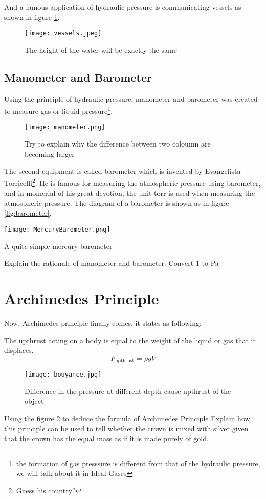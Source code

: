 \documentclass[a4paper]{tufte-handout}
\newenvironment{pagefigure}{%
    \begin{figure}[h]
    \classiccaptionstyle
  }{\end{figure}}
\newenvironment{TaskBox} %
{\begin{tcolorbox}[breakable,colback=b1!30,colframe=b1,title=Task]} {\end{tcolorbox}}
\newenvironment{SummBox}
{\begin{tcolorbox}[breakable,colback=r1!30,colframe=r1,title=Summary]} {\end{tcolorbox}}
\begin{document}
And a famous application of hydraulic pressure is communicating vessels as shown in figure \ref{fig:vessels}.
\begin{pagefigure}
\centering
\texttt{[image: vessels.jpeg]}
\caption{The height of the water will be exactly the same}
\label{fig:vessels}
\end{pagefigure}

\subsection{Manometer and Barometer}
Using the principle of hydraulic pressure, manometer and barometer was created to measure gas or liquid  pressure\footnote{the formation of gas presssure is different from that of the hydraulic pressure, we will talk about it in Ideal Gases}.
\begin{pagefigure}
\centering
\texttt{[image: manometer.png]}
\caption{Try to explain why the difference between two coloumn are becoming larger}
\end{pagefigure}

The second equipment is called barometer which is invented by Evangelista Torricelli\footnote{Guess his country?}. He is famous for measuring the atmospheric pressure using barometer, and in momerial of his great devotion, the unit torr is used when measuring the atmospheric pressure. The diagram of a barometer is shown as in figure \ref{fig:barometer}.
\begin{marginfigure}
\texttt{[image: MercuryBarometer.png]}
\caption{A quite simple mercury barometer}
\label{fig:barometer}
\end{marginfigure}

\begin{TaskBox}
Explain the rationale of manometer and barometer.
\tcblower
Convert \SI{1}{\torr} to \si{\pascal}
\end{TaskBox}

\section{Archimedes Principle}
Now, Archimedes principle finally comes, it states as following:
\begin{SummBox}
The upthrust acting on a body is equal to the weight of the liquid or gas that it displaces.
\[
  F_{\text{upthrust}} = \rho g V
\]
\end{SummBox}

\begin{pagefigure}
\texttt{[image: bouyance.jpg]}
\caption{Difference in the pressure at different depth cause upthrust of the object}
\label{fig:bouyance}
\end{pagefigure}

\begin{TaskBox}
Using the figure \ref{fig:bouyance} to deduce the formula of Archimedes Principle
\tcblower
Explain how this principle can be used to tell whether the crown is mixed with silver given that the crown has the equal mass as if it is made purely of gold.
\end{TaskBox}
\end{document}
